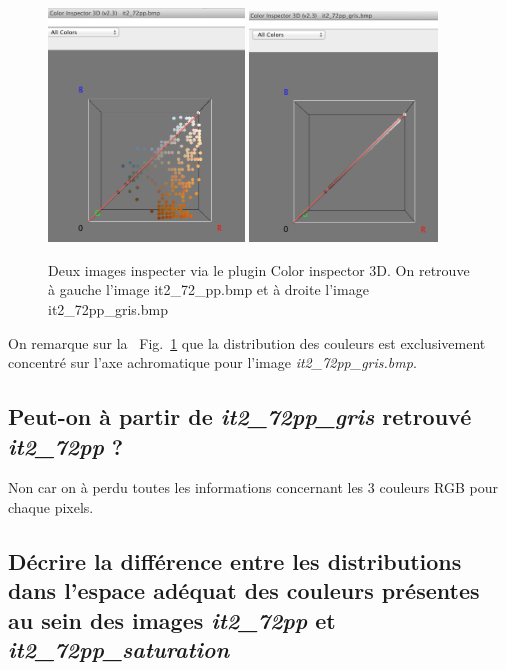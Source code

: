 \documentclass[a4paper,10pt]{article}
\begin{document}
\begin{figure}[ht]
\begin{center}
	\includegraphics[width=5.2cm]{images/it2_72pp}
	\includegraphics[width=5cm]{images/it2_72pp_gris}
\end{center}
	\caption{Deux images inspecter via le plugin Color inspector 3D. On retrouve \`a gauche l'image it2\_72\_pp.bmp et \`a droite l'image it2\_72pp\_gris.bmp}
	\label{img2}
\end{figure}

On remarque sur la ~Fig.~\ref{img2} que la distribution des couleurs est exclusivement concentr\'e sur l'axe achromatique pour l'image \emph{it2\_72pp\_gris.bmp}.

\subsection{Peut-on \`a partir de \emph{it2\_72pp\_gris} retrouv\'e \emph{it2\_72pp} ?}

Non car on \`a perdu toutes les informations concernant les 3 couleurs RGB pour chaque pixels.

\subsection{D\'ecrire la diff\'erence entre les distributions dans l'espace ad\'equat des couleurs pr\'esentes au sein des images \emph{it2\_72pp} et \emph{it2\_72pp\_saturation}}
\end{document}
